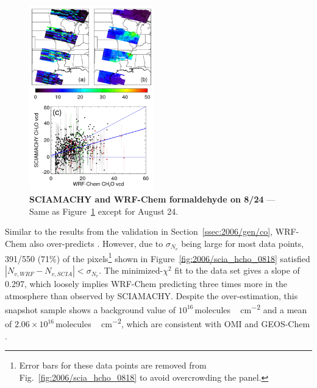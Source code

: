 	\begin{figure}
		\centering
		\vspace{-.4in}
		\begin{singlespacing}
		\includegraphics[width=0.48\textwidth]{scia_ch2o_compare_0824}
		\caption[SCIAMACHY and WRF-Chem formaldehyde on 8/24]{{\small\textbf{SCIAMACHY and WRF-Chem formaldehyde on 8/24} --- Same as
		Figure~\ref{fig:2006/scia_hcho_0824} except for August 24.}}
		\label{fig:2006/scia_hcho_0824}
		\end{singlespacing}
		\vspace{-.3in}
	\end{figure}

Similar to the results from the  validation in Section~\ref{ssec:2006/gen/co}, WRF-Chem also over-predicts . However, due to $\sigma_{N_v}$ being large
for most data points, 391/550 (71\%) of the pixels\footnote{Error bars for these data points are removed from Fig.~\ref{fig:2006/scia_hcho_0818} to avoid overcrowding the panel.}
shown in Figure~\ref{fig:2006/scia_hcho_0818} satisfied $|N_{v,WRF}-N_{v,SCIA}|<\sigma_{N_v}$. The minimized-$\chi^2$ fit to the data set gives a slope of 0.297, which loosely
implies WRF-Chem predicting three times more  in the atmosphere than observed by SCIAMACHY. Despite the over-estimation, this snapshot sample shows
a background value of $10^{16}$\,\unit{molecules\,cm^{-2}} and a mean of $2.06\times10^{16}$\,\unit{molecules\,cm^{-2}}, which are consistent with OMI and GEOS-Chem
\citep{Millet:2008oq}.

